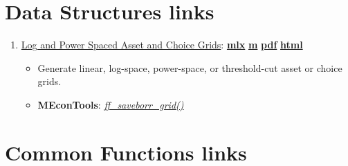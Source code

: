 \documentclass[
]{book}
\providecommand{\tightlist}{%
  \setlength{\itemsep}{0pt}\setlength{\parskip}{0pt}}
\begin{document}
\hypertarget{data-structures-links}{%
\section{Data Structures links}\label{data-structures-links}}

\begin{enumerate}
\def\labelenumi{\arabic{enumi}.}
\tightlist
\item
  \href{https://fanwangecon.github.io/MEconTools/MEconTools/doc/generate/htmlpdfm/fx_saveborr_grid.html}{Log and Power Spaced Asset and Choice Grids}: \href{https://github.com/FanWangEcon/MEconTools/blob/master/MEconTools/doc/generate/fx_saveborr_grid.mlx}{\textbf{mlx}} \textbar{} \href{https://github.com/FanWangEcon/MEconTools/blob/master/MEconTools/doc/generate/htmlpdfm/fx_saveborr_grid.m}{\textbf{m}} \textbar{} \href{https://github.com/FanWangEcon/MEconTools/blob/master/MEconTools/doc/generate/htmlpdfm/fx_saveborr_grid.pdf}{\textbf{pdf}} \textbar{} \href{https://fanwangecon.github.io/MEconTools/MEconTools/doc/generate/htmlpdfm/fx_saveborr_grid.html}{\textbf{html}}

  \begin{itemize}
  \tightlist
  \item
    Generate linear, log-space, power-space, or threshold-cut asset or choice grids.
  \item
    \textbf{MEconTools}: \emph{\href{https://github.com/FanWangEcon/MEconTools/blob/master/MEconTools/generate/ff_saveborr_grid.m}{ff\_saveborr\_grid()}}
  \end{itemize}
\end{enumerate}

\hypertarget{common-functions-links}{%
\section{Common Functions links}\label{common-functions-links}}
\end{document}
